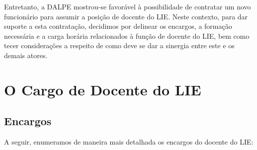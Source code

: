 Entretanto, a DALPE mostrou-se favorável à possibilidade de contratar um novo funcionário para assumir a posição de docente do LIE. Neste contexto, para dar suporte a esta contratação, decidimos por delinear os encargos, a formação necessária e a carga horária relacionados à função de docente do LIE, bem como tecer considerações a respeito de como deve se dar a sinergia entre este e os demais atores.

\section{O Cargo de Docente do LIE}\label{chp:LABEL_CHP_CONC_SEC_DOC}

\subsection{Encargos}\label{chp:LABEL_CHP_CONC_SEC_DOC_SUBSEC_ENC}

A seguir, enumeramos de maneira mais detalhada os encargos do docente do LIE:


